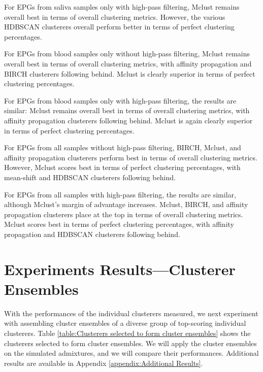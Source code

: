 For EPGs from saliva samples only with high-pass filtering, Mclust remains overall best in terms of overall clustering metrics. However, the various HDBSCAN clusterers overall perform better in terms of perfect clustering percentages.

For EPGs from blood samples only without high-pass filtering, Mclust remains overall best in terms of overall clustering metrics, with affinity propagation and BIRCH clusterers following behind. Mclust is clearly superior in terms of perfect clustering percentages.

For EPGs from blood samples only with high-pass filtering, the results are similar: Mclust remains overall best in terms of overall clustering metrics, with affinity propagation clusterers following behind. Mclust is again clearly superior in terms of perfect clustering percentages.

For EPGs from all samples without high-pass filtering, BIRCH, Mclust, and affinity propagation clusterers perform best in terms of overall clustering metrics. However, Mclust scores best in terms of perfect clustering percentages, with mean-shift and HDBSCAN clusterers following behind.

For EPGs from all samples with high-pass filtering, the results are similar, although Mclust's margin of advantage increases. Mclust, BIRCH, and affinity propagation clusterers place at the top in terms of overall clustering metrics. Mclust scores best in terms of perfect clustering percentages, with affinity propagation and HDBSCAN clusterers following behind.

\section{Experiments Results---Clusterer Ensembles}

With the performances of the individual clusterers measured, we next experiment with assembling cluster ensembles of a diverse group of top-scoring individual clusterers. Table \ref{table:Clusterers selected to form cluster ensembles} shows the clusterers selected to form cluster ensembles. We will apply the cluster ensembles on the simulated admixtures, and we will compare their performances. Additional results are available in Appendix \ref{appendix:Additional Results}.

